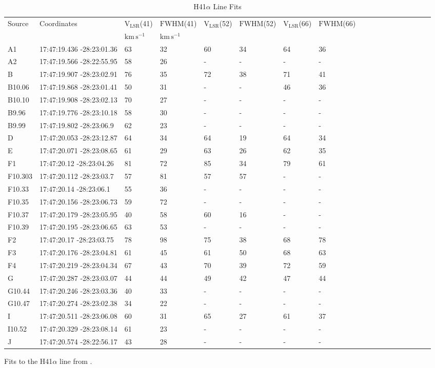 \begin{table}[htp]
\caption{H41$\alpha$ Line Fits}

\begin{tabular}{llllllllllllllllll}
\label{tab:h41afits}
Source & Coordinates & V$_\mathrm{LSR}$(41) & $\mathrm{FWHM}$(41) & V$_\mathrm{LSR}$(52) & $\mathrm{FWHM}$(52) & V$_\mathrm{LSR}$(66) & $\mathrm{FWHM}$(66) \\
 &  & $\mathrm{km\,s^{-1}}$ & $\mathrm{km\,s^{-1}}$ &  &  &  &  \\
\hline
A1 & 17:47:19.436 -28:23:01.36 & 63 & 32 & 60 & 34 & 64 & 36 \\
A2 & 17:47:19.566 -28:22:55.95 & 58 & 26 & - & - & - & - \\
B & 17:47:19.907 -28:23:02.91 & 76 & 35 & 72 & 38 & 71 & 41 \\
B10.06 & 17:47:19.868 -28:23:01.41 & 50 & 31 & - & - & 46 & 36 \\
B10.10 & 17:47:19.908 -28:23:02.13 & 70 & 27 & - & - & - & - \\
B9.96 & 17:47:19.776 -28:23:10.18 & 58 & 30 & - & - & - & - \\
B9.99 & 17:47:19.802 -28:23:06.9 & 62 & 23 & - & - & - & - \\
D & 17:47:20.053 -28:23:12.87 & 64 & 34 & 64 & 19 & 64 & 34 \\
E & 17:47:20.071 -28:23:08.65 & 61 & 29 & 63 & 26 & 62 & 35 \\
F1 & 17:47:20.12 -28:23:04.26 & 81 & 72 & 85 & 34 & 79 & 61 \\
F10.303 & 17:47:20.112 -28:23:03.7 & 57 & 81 & 57 & 57 & - & - \\
F10.33 & 17:47:20.14 -28:23:06.1 & 55 & 36 & - & - & - & - \\
F10.35 & 17:47:20.156 -28:23:06.73 & 59 & 72 & - & - & - & - \\
F10.37 & 17:47:20.179 -28:23:05.95 & 40 & 58 & 60 & 16 & - & - \\
F10.39 & 17:47:20.195 -28:23:06.65 & 63 & 53 & - & - & - & - \\
F2 & 17:47:20.17 -28:23:03.75 & 78 & 98 & 75 & 38 & 68 & 78 \\
F3 & 17:47:20.176 -28:23:04.81 & 61 & 45 & 61 & 50 & 68 & 63 \\
F4 & 17:47:20.219 -28:23:04.34 & 67 & 43 & 70 & 39 & 72 & 59 \\
G & 17:47:20.287 -28:23:03.07 & 44 & 44 & 49 & 42 & 47 & 44 \\
G10.44 & 17:47:20.246 -28:23:03.36 & 40 & 33 & - & - & - & - \\
G10.47 & 17:47:20.274 -28:23:02.38 & 34 & 22 & - & - & - & - \\
I & 17:47:20.511 -28:23:06.08 & 60 & 31 & 65 & 27 & 61 & 37 \\
I10.52 & 17:47:20.329 -28:23:08.14 & 61 & 23 & - & - & - & - \\
J & 17:47:20.574 -28:22:56.17 & 43 & 28 & - & - & - & - \\
\hline
\end{tabular}
\par
Fits to the H41$\alpha$ line from \citet{Ginsburg2018a}.
\end{table}
